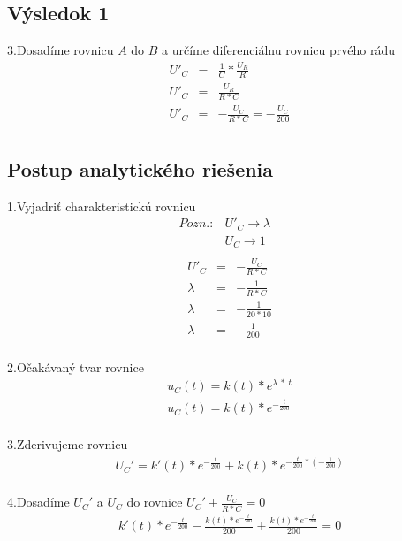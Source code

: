 \documentclass[a4paper,oneside,12pt]{article}
\begin{document}
\subsection{Výsledok 1}

3.Dosadíme rovnicu $A$ do $B$ a určíme diferenciálnu rovnicu prvého rádu
\begin{eqnarray*}
	U'_{C} &= & \frac{1}{C} * \frac{U_{R}}{R} \\
	U'_{C} &= & \frac{U_{R}}{R*C} \\
	U'_{C} &= & -\frac{U_{C}}{R*C} = -\frac{U_{C}}{200}\\ 
\end{eqnarray*}

\maketitle
\subsection{Postup analytického riešenia}

1.Vyjadriť charakteristickú rovnicu
\begin{eqnarray*}
	Pozn.: &U'_{C} \rightarrow \lambda & \\
	&U_{C} \rightarrow 1 & \\
\end{eqnarray*}
\begin{eqnarray*}
	U'_{C} &=  & -\frac{U_{C}}{R*C}  \\
	\lambda &= & -\frac{1}{R*C}  \\
	\lambda &= & -\frac{1}{20*10}  \\
	\lambda &= & -\frac{1}{200}  \\
\end{eqnarray*}

2.Očakávaný tvar rovnice
\begin{eqnarray*}
	u_{C}(t) = k(t) * e^{\lambda \ * \ t} \\
	u_{C}(t) = k(t) * e^{-\frac{t}{200}} \\	
\end{eqnarray*}

3.Zderivujeme rovnicu
\begin{eqnarray*}
	U_{C}' = k'(t) * e^{-\frac{t}{200}} + k(t) * e^{-\frac{t}{200} * (-\frac{1}{200})} \\
\end{eqnarray*}

4.Dosadíme $U_{C}'$ a $U_{C}$ do rovnice $U_{C}' + \frac{U_{C}}{R * C} = 0$ 
\begin{eqnarray*}
	k'(t) * e^{-\frac{t}{200}} - \frac{k(t) * e^{-\frac{t}{200}}}{200} + \frac{k(t) * e^{-\frac{t}{200}}}{200} = 0 \\
\end{eqnarray*}
\end{document}
